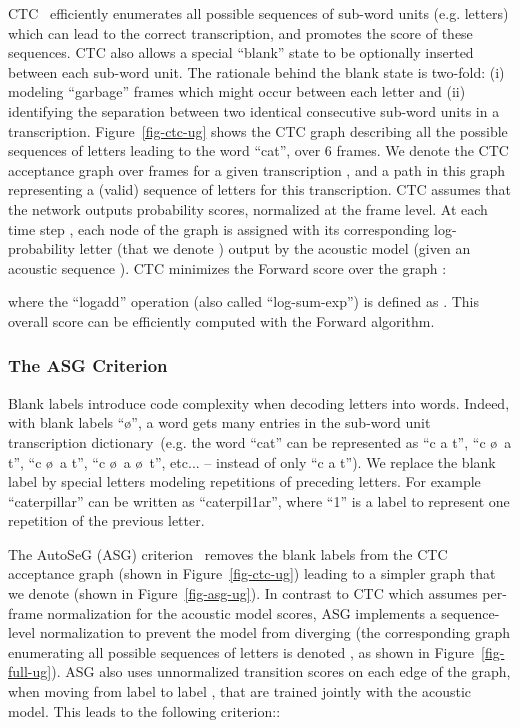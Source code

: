 \documentclass{article}
\begin{document}
CTC~\citep{graves2006connectionist} efficiently enumerates all possible
sequences of sub-word units (e.g. letters) which can lead to the correct
transcription, and promotes the score of these sequences. CTC also allows a
special ``blank'' state to be optionally inserted between each sub-word
unit. The rationale behind the blank state is two-fold: (i) modeling
``garbage'' frames which might occur between each letter and (ii)
identifying the separation between two identical consecutive sub-word units
in a transcription. Figure~\ref{fig-ctc-ug} shows the CTC graph describing
all the possible sequences of letters leading to the word ``cat'', over 6
frames. We denote  the CTC acceptance graph over
 frames for a given transcription , and  a path in this graph representing a
(valid) sequence of letters for this transcription. CTC assumes that the
network outputs probability scores, normalized at the frame level. At each
time step , each node of the graph is assigned with its corresponding
log-probability letter  (that we denote ) output by
the acoustic model (given an acoustic sequence ). CTC minimizes
the Forward score over the graph :

where the ``logadd'' operation (also called ``log-sum-exp'') is
defined as . This overall score
can be efficiently computed with the Forward algorithm.

\subsubsection{The ASG Criterion}
\label{sec-autosegcriterion}

Blank labels introduce code complexity when decoding letters into words. Indeed,
with blank labels ``\o'', a word gets many entries in the sub-word unit
transcription dictionary~(e.g. the word ``cat'' can be represented as ``c a
t'', ``c \o\ a t'', ``c \o\ a t'', ``c \o\ a \o\ t'', etc... -- instead of
only ``c a t''). We replace the blank label by special letters modeling
repetitions of preceding letters. For example ``caterpillar'' can be
written as ``caterpil1ar'', where ``1'' is a label to represent one
repetition of the previous letter.

The AutoSeG (ASG) criterion~\citep{collobert2016wav2letter} removes the
blank labels from the CTC acceptance graph 
(shown in Figure~\ref{fig-ctc-ug}) leading to a simpler graph that we
denote  (shown in Figure~\ref{fig-asg-ug}). In
contrast to CTC which assumes per-frame normalization for the acoustic
model scores, ASG implements a sequence-level normalization to prevent the
model from diverging (the corresponding graph enumerating all possible
sequences of letters is denoted , as shown in
Figure~\ref{fig-full-ug}). ASG also uses unnormalized transition scores
 on each edge of the graph, when moving from label  to
label , that are trained jointly with the acoustic model. 
This leads to the following criterion::
\end{document}
